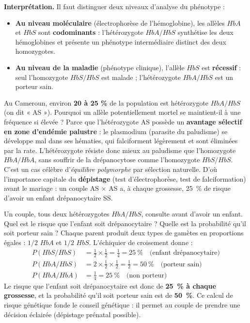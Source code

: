 \documentclass[11pt]{article}
\newcommand{\cle}[1]{{\popxbold\color{popdark}#1}}
\begin{document}
\textbf{Interprétation.} Il faut distinguer deux niveaux d'analyse du phénotype :

\begin{itemize}
\item \textbf{Au niveau moléculaire} (électrophorèse de l'hémoglobine), les allèles $HbA$ et $HbS$ sont \textbf{codominants} : l'hétérozygote $HbA/HbS$ synthétise les deux hémoglobines et présente un phénotype intermédiaire distinct des deux homozygotes.
\item \textbf{Au niveau de la maladie} (phénotype clinique), l'allèle $HbS$ est \textbf{récessif} : seul l'homozygote $HbS/HbS$ est malade ; l'hétérozygote $HbA/HbS$ est un porteur sain.
\end{itemize}

\begin{savaistu}
Au Cameroun, environ \textbf{20 à 25 \%} de la population est hétérozygote $HbA/HbS$ (on dit « AS »). Pourquoi un allèle potentiellement mortel se maintient-il à une fréquence si élevée ? Parce que l'hétérozygote AS possède un \textbf{avantage sélectif en zone d'endémie palustre} : le plasmodium (parasite du paludisme) se développe mal dans ses hématies, qui falciforment légèrement et sont éliminées par la rate. L'hétérozygote résiste donc mieux au paludisme que l'homozygote $HbA/HbA$, sans souffrir de la drépanocytose comme l'homozygote $HbS/HbS$. C'est un cas célèbre d'\emph{équilibre polymorphe} par sélection naturelle. D'où l'importance capitale du \textbf{dépistage} (test d'électrophorèse, test de falciformation) avant le mariage : un couple AS $\times$ AS a, à chaque grossesse, \SI{25}{\%} de risque d'avoir un enfant drépanocytaire SS.
\end{savaistu}

\begin{exoresolu}
Un couple, tous deux hétérozygotes $HbA/HbS$, consulte avant d'avoir un enfant. Quel est le risque que l'enfant soit drépanocytaire ? Quelle est la probabilité qu'il soit porteur sain ?
\tcblower
Chaque parent produit deux types de gamètes en proportions égales : $1/2$ $HbA$ et $1/2$ $HbS$. L'échiquier de croisement donne :
\begin{align*}
P(HbS/HbS) &= \tfrac{1}{2}\times\tfrac{1}{2} = \tfrac{1}{4} = \SI{25}{\%} \quad \text{(enfant drépanocytaire)}\\
P(HbA/HbS) &= 2\times\tfrac{1}{2}\times\tfrac{1}{2} = \tfrac{1}{2} = \SI{50}{\%} \quad \text{(porteur sain)}\\
P(HbA/HbA) &= \tfrac{1}{4} = \SI{25}{\%} \quad \text{(non porteur)}
\end{align*}
Le risque que l'enfant soit drépanocytaire est donc de \textbf{\SI{25}{\%} à chaque grossesse}, et la probabilité qu'il soit porteur sain est de \textbf{\SI{50}{\%}}. Ce calcul de \cle{risque génétique} fonde le conseil génétique : il permet au couple de prendre une décision éclairée (dépistage prénatal possible).
\end{exoresolu}
\end{document}
